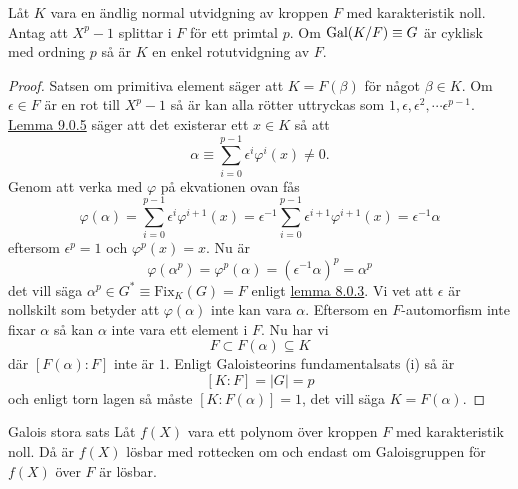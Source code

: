 \documentclass{article}
\newcommand{\gal}[0]{\textnormal{Gal}}
\theoremstyle{definition}
\begin{document}
\hypertarget{lemma10.0.6}{}
\begin{mylemma}{}{}
  Låt $K$ vara en ändlig normal utvidgning av kroppen $F$ med karakteristik noll. Antag att $X^p - 1$ splittar i $F$ för ett primtal $p$. 
  Om $\gal(K/F) \equiv G$ är cyklisk med ordning $p$ så är $K$ en enkel rotutvidgning av $F$.
\end{mylemma}

\begin{proof}
  Satsen om primitiva element säger att $K = F(\beta)$ för något $\beta \in K$. Om $\epsilon \in F$ är en rot till $X^p - 1$ så är 
  kan alla rötter uttryckas som $1, \epsilon, \epsilon^2, \cdots \epsilon^{p-1}$. \hyperlink{lemma10.0.5}{Lemma 9.0.5}
  säger att det existerar ett $x \in K$ så att 
  \[ \alpha \equiv \sum_{i = 0}^{p-1} \epsilon^i \varphi^i(x) \neq 0. \]
  Genom att verka med $\varphi$ på ekvationen ovan fås 
  \[\varphi(\alpha) = \sum_{i = 0}^{p-1} \epsilon^i \varphi^{i+1}(x)= \epsilon^{-1} \sum_{i = 0}^{p-1} \epsilon^{i+1} \varphi^{i+1}(x)
  = \epsilon^{-1} \alpha\]
  eftersom $\epsilon^p = 1$ och $\varphi^p(x) = x$.
  Nu är 
  \[ \varphi(\alpha^p) = \varphi^p(\alpha) = (\epsilon^{-1} \alpha)^p = \alpha^p \]
  det vill säga $\alpha^p \in G^* \equiv \text{Fix}_K(G) = F$ enligt \hyperlink{lemma9.0.3}{lemma 8.0.3}. Vi vet att 
  $\epsilon$ är nollskilt som betyder att $\varphi(\alpha)$ inte kan vara $\alpha$. Eftersom en $F$-automorfism inte fixar 
  $\alpha$ så kan $\alpha$ inte vara ett element i $F$. Nu har vi 
  \[F \subset F(\alpha) \subseteq K\]
  där $[F(\alpha):F]$ inte är $1$. 
  Enligt Galoisteorins fundamentalsats (i) så är 
  \[ [K:F] = |G| = p \]
  och enligt torn lagen så måste $[K:F(\alpha)] = 1$, det vill säga $K = F(\alpha)$.
\end{proof}

\begin{mytheo}{Galois stora sats}{}
  Låt $f(X)$ vara ett polynom över kroppen $F$ med karakteristik noll. Då är $f(X)$ lösbar med rottecken om och endast om 
  Galoisgruppen för $f(X)$ över $F$ är lösbar. 
\end{mytheo}
\end{document}
